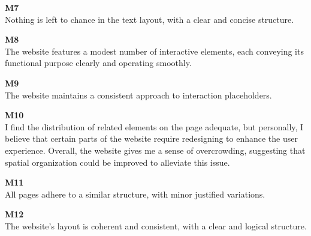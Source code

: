 \begin{description}
\begin{figure}[h]
    \end{figure}
    \item {\textbf{M7} \color{unicefGray}{Text layout}}\\
    Nothing is left to chance in the text layout, with a clear and concise structure.
    \item {\textbf{M8} \color{unicefGray}{Interaction placeholder semiotics}}\\
    The website features a modest number of interactive elements, each conveying its functional purpose clearly and operating smoothly.
    \item {\textbf{M9} \color{unicefGray}{Interaction placeholder consistency}}\\
    The website maintains a consistent approach to interaction placeholders.
    \item {\textbf{M10} \color{unicefGray}{Spatial allocation}}\\
    I find the distribution of related elements on the page adequate, but personally, I believe that certain parts of the website require redesigning to enhance the user experience. 
    Overall, the website gives me a sense of overcrowding, suggesting that spatial organization could be improved to alleviate this issue.
    \item {\textbf{M11} \color{unicefGray}{Consistency of the page structure}}\\
    All pages adhere to a similar structure, with minor justified variations.
    \item {\textbf{M12} \color{unicefGray}{Coherence in page layout}}\\
    The website's layout is coherent and consistent, with a clear and logical structure.
\end{description}


